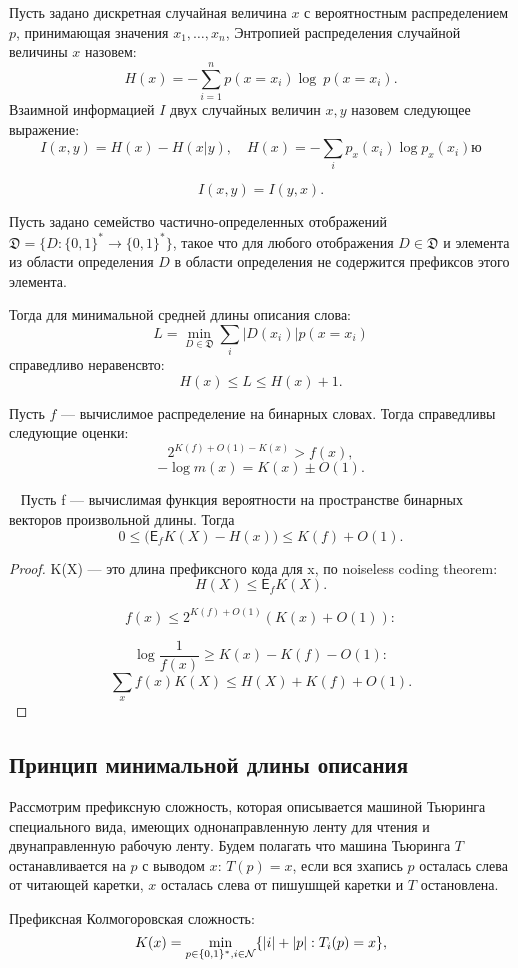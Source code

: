 \documentclass[../main.tex]{subfiles}
\begin{document}
\begin{definition}
Пусть задано дискретная случайная величина $x$ с вероятностным распределением $p$, принимающая значения $x_1, \dots, x_n$,
Энтропией распределения случайной величины $x$ назовем:
\[
	H(x) = -\sum_{i=1}^n p(x = x_i) \log~p(x = x_i).
\]
Взаимной информацией $I$ двух случайных величин $x,y$ назовем следующее выражение:
\[
	I(x,y) = H(x) - H(x|y), \quad H(x) = - \sum_{i} p_x(x_i) \log p_x(x_i)ю
\]
\end{definition}


\[
	I(x,y) = I(y,x).
\]

\begin{theorem}
Пусть задано семейство частично-определенных отображений $\mathfrak{D} = \{D: \{0,1\}^{*} \to \{0,1\}^{*}\}$,
такое что для любого отображения $D \in \mathfrak{D}$ и элемента из области определения $D$ в области определения не содержится префиксов этого элемента.

Тогда для минимальной средней длины описания слова:
\[
	L = \min_{D \in \mathfrak{D}}\sum_{i}|D(x_i)|p(x = x_i)
\] 
справедливо неравенсвто:
\[
	H(x) \leq L \leq H(x)+1.
\]
\end{theorem}

\begin{theorem}
Пусть $f$ --- вычислимое распределение на бинарных словах. Тогда справедливы следующие оценки:
\[
	2^{K(f) + O(1) - K(x)} > f(x),
\]
\[
	-\log m(x) = K(x) \pm O(1).
\]
\end{theorem}
\begin{theorem}~\cite{grun_ks}
Пусть f --- вычислимая функция вероятности на пространстве бинарных векторов произвольной длины. Тогда 
\[
	0 \leq \bigl(\mathsf{E}_f K(X) - H(x) \bigr) \leq K(f)  + O(1).
\]
\end{theorem}

\begin{proof}
K(X) --- это длина префиксного кода для x, по noiseless coding theorem:
\[
	H(X) \leq \mathsf{E}_f K(X).
\]

\[
	f(x) \leq 2^{K(f) + O(1)} (K(x) + O(1)):
\]

\[
	 \log\frac{1}{f(x)} \geq K(x) - K(f) - O(1):
\]
\[
	\sum_{x} f(x) K(X) \leq H(X) + K(f)  + O(1).
\]

\end{proof}




\subsection{Принцип минимальной длины описания}
Рассмотрим префиксную сложность, которая описывается машиной Тьюринга специального вида, имеющих однонаправленную ленту для чтения и двунаправленную рабочую ленту. Будем полагать что машина Тьюринга $T$ останавливается на $p$ с выводом $x$: $T(p) = x$, если вся зхапись $p$ осталась слева от читающей каретки, $x$ осталась слева от пишушщей каретки и $T$ остановлена.
\begin{definition}
Префиксная Колмогоровская сложность:
\[
K(x) = \min_{p \in \{0,1\}^* ,i \in \mathcal{N}}\{|i|+|p|: T_i(p) = x\},
\]
\end{definition}
\end{document}
